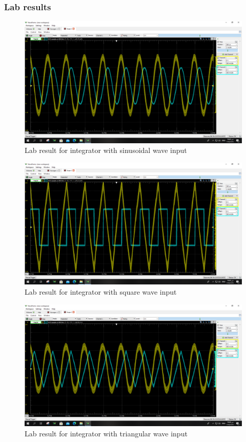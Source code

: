 \documentclass[a4paper, 12pt, english]{article}
\begin{document}
\subsubsection{Lab results}
\begin{figure}[H]
    \centering
    \includegraphics[width=\linewidth]{images/int sine lab.png}
    \caption{Lab result for integrator with sinusoidal wave input}
    \label{fig:Lab result for integrator with sinusoidal wave input}
\end{figure}
\begin{figure}[H]
    \centering
    \includegraphics[width=\linewidth]{images/int square lab.png}
    \caption{Lab result for integrator with square wave input}
    \label{fig:Lab result for integrator with square wave input}
\end{figure}
\begin{figure}[H]
    \centering
    \includegraphics[width=\linewidth]{images/int tri lab.png}
    \caption{Lab result for integrator with triangular wave input}
    \label{fig:Lab result for integrator with triangular wave input}
\end{figure}
\end{document}
